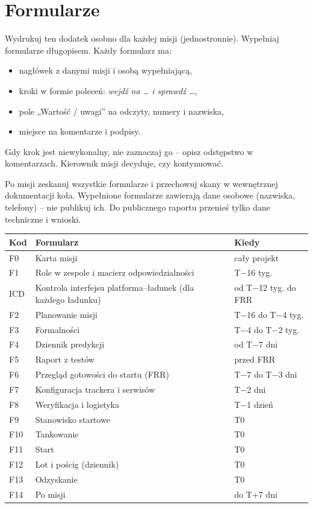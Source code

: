 \chapter{Formularze}\label{dod:formularze}

\begin{blok}
Wydrukuj ten dodatek osobno dla każdej misji (jednostronnie). Wypełniaj formularze długopisem. Każdy formularz ma:
\begin{itemize}
  \item nagłówek z danymi misji i osobą wypełniającą,
  \item kroki w formie poleceń: \emph{wejdź na \dots{} i sprawdź \dots{}},
  \item pole „Wartość / uwagi” na odczyty, numery i nazwiska,
  \item miejsce na komentarze i podpisy.
\end{itemize}
Gdy krok jest niewykonalny, nie zaznaczaj go -- opisz odstępstwo w komentarzach. Kierownik misji decyduje, czy kontynuować.

Po misji zeskanuj wszystkie formularze i przechowuj skany w wewnętrznej dokumentacji koła. Wypełnione formularze zawierają dane osobowe (nazwiska, telefony) -- nie publikuj ich. Do publicznego raportu przenieś tylko dane techniczne i wnioski.

\medskip
\renewcommand{\arraystretch}{1.25}
\begin{tabularx}{\linewidth}{@{}P{12mm}LP{38mm}@{}}
\toprule
\textbf{Kod} & \textbf{Formularz} & \textbf{Kiedy}\\\midrule
F0 & Karta misji & cały projekt\\
F1 & Role w zespole i macierz odpowiedzialności & T$-$16 tyg.\\
ICD & Kontrola interfejsu platforma--ładunek (dla każdego ładunku) & od T$-$12 tyg. do FRR\\
F2 & Planowanie misji & T$-$16 do T$-$4 tyg.\\
F3 & Formalności & T$-$4 do T$-$2 tyg.\\
F4 & Dziennik predykcji & od T$-$7 dni\\
F5 & Raport z testów & przed FRR\\
F6 & Przegląd gotowości do startu (FRR) & T$-$7 do T$-$3 dni\\
F7 & Konfiguracja trackera i serwisów & T$-$2 dni\\
F8 & Weryfikacja i logistyka & T$-$1 dzień\\
F9 & Stanowisko startowe & T0\\
F10 & Tankowanie & T0\\
F11 & Start & T0\\
F12 & Lot i pościg (dziennik) & T0\\
F13 & Odzyskanie & T0\\
F14 & Po misji & do T+7 dni\\
\bottomrule
\end{tabularx}
\end{blok}

